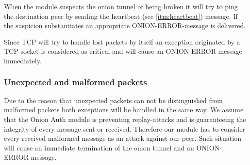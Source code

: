 \documentclass{article}
\begin{document}
When the module suspects the onion tunnel of being broken it will try to ping the destination peer
by sending the heartbeat (see \ref{itm:heartbeat}) message. If the suspicion substantiates an
appropriate ONION-ERROR-message is delivered.

Since TCP will try to handle lost packets by itself an exception originated by a TCP-socket is
considered as critical and will cause an ONION-ERROR-message immediately.

\subsubsection{Unexpected and malformed packets}
Due to the reason that unexpected packets can not be distinguished from malformed packets both
exceptions will be handled in the same way. We assume that the Onion Auth module is preventing
replay-attacks and is guaranteeing the integrity of every message sent or received. Therefore our
module has to consider every received malformed message as an attack against our peer. Such
situation will cause an immediate termination of the onion tunnel and an ONION-ERROR-message.
\end{document}
